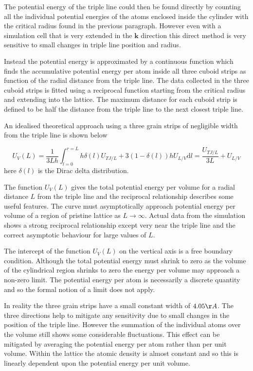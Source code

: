 \documentclass[12pt,a4paper]{book}
\begin{document}
The potential energy of the triple line could then be found directly by counting all the individual potential energies of the atoms enclosed inside the cylinder with the critical radius found in the previous paragraph. However even with a simulation cell that is very extended in the $\mathbf{k}$ direction this direct method is very sensitive to small changes in triple line position and radius.

Instead the potential energy is approximated by a continuous function which finds the accumulative potential energy per atom inside all three cuboid strips as function of the radial distance from the triple line. The data collected in the three cuboid strips is fitted using a reciprocal function starting from the critical radius and extending into the lattice. The maximum distance for each cuboid strip is defined to be half the distance from the triple line to the next closest triple line.


An idealised theoretical approach using a three grain strips of negligible width from the triple line is shown below 

\[ U_V(L) =\frac{1}{3 L h}\int_{l=0}^{r=L} h \delta(l) U_{TJ/L} + 3(1-\delta(l) ) h U_{L/V}  \text{d}l = \frac{U_{TJ/L}}{3L}  + U_{L/V} 
\label{eq:L1}
\]
here $\delta(l)$ is the Dirac delta distribution.

The function $U_V(L)$ gives the total potential energy per volume for a radial distance $L$ from the triple line and the reciprocal relationship describes some useful features. The curve must asymptotically approach potential energy per volume of a region of pristine lattice as $L \rightarrow \infty$. Actual data from the simulation shows a strong reciprocal relationship except very near the triple line and the correct asymptotic behaviour for large values of $L$. 

The intercept  of the function $U_V(L)$ on the vertical axis is a free boundary condition. Although the total potential energy must shrink to zero as the volume of the cylindrical region shrinks to zero the energy per volume may approach a non-zero limit. The potential energy per atom is necessarily a discrete quantity and so the formal notion of a limit does not apply. 

In reality the three grain strips have a small constant width of $4.05 \AA$. The three directions help to mitigate any sensitivity due to small changes in the position of the triple line. However the summation of the individual atoms over the volume still shows some considerable fluctuations. This effect can be mitigated by averaging the potential energy per atom rather than per unit volume. Within the lattice the atomic density is almost constant and so this is linearly dependent upon the potential energy per unit volume.  
\end{document}
